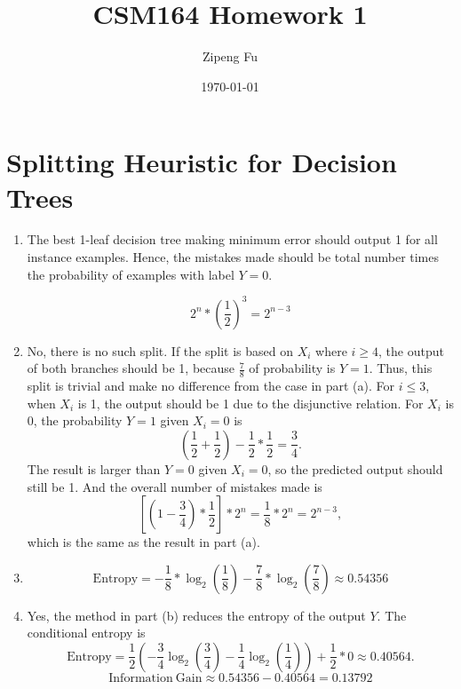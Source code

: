 \documentclass[11pt]{article}
\author{Zipeng Fu}
\date{\today}
\title{CSM164 Homework 1}
\begin{document}
\maketitle
\newpage

\section{Splitting Heuristic for Decision Trees}
\begin{enumerate}[label=(\alph*)]
    \item
        The best 1-leaf decision tree making minimum error should output 1 for all instance examples. Hence, the mistakes made should be total number times the probability of examples with label $Y = 0$.

        $$2^n * \left(\frac{1}{2}\right)^3 = 2^{n-3}$$

    \item
        No, there is no such split. If the split is based on $X_i$ where $i\geq4$, the output of both branches should be 1, because $\frac{7}{8}$ of probability is $Y = 1$. Thus, this split is trivial and make no difference from the case in part (a). For $i\leq3$, when $X_i$ is 1, the output should be 1 due to the disjunctive relation. For $X_i$ is 0, the probability $Y=1$ given $X_i = 0$ is
        $$\left(\frac{1}{2}+\frac{1}{2}\right)-\frac{1}{2}*\frac{1}{2}=\frac{3}{4}.$$
        The result is larger than $Y=0$ given $X_i = 0$, so the predicted output should still be 1. And the overall number of mistakes made is
        $$\left[\left(1-\frac{3}{4}\right)*\frac{1}{2}\right]*2^{n} = \frac{1}{8}*2^{n} = 2^{n-3},$$
        which is the same as the result in part (a).
    
    \item
        $$\mathrm{Entropy} = -\frac{1}{8}*\log_2{\left(\frac{1}{8}\right)} - \frac{7}{8}*\log_2{\left(\frac{7}{8}\right)} \approx 0.54356$$
    
    \item
        Yes, the method in part (b) reduces the entropy of the output $Y$. The conditional entropy is $$\mathrm{Entropy} = \frac{1}{2} \left(-\frac{3}{4}\log_2{\left(\frac{3}{4}\right)} - \frac{1}{4}\log_2{\left(\frac{1}{4}\right)}\right) + \frac{1}{2}*0 \approx 0.40564. $$
        $$\mathrm{Information\:Gain} \approx 0.54356 - 0.40564 = 0.13792$$
\\
\end{enumerate}
\end{document}
